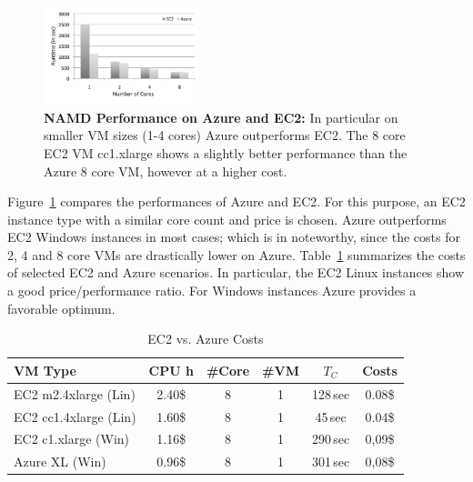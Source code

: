 \documentclass[conference,final]{IEEEtran}
\newcommand{\up}{\vspace*{-1em}}
\newcommand{\tc}{$T_{C}$ }
\begin{document}
\begin{figure}[t]
    \centering
        \includegraphics[width=0.4\textwidth]{performance/namd_ec2_azure.pdf}
        \up
        \caption{\textbf{NAMD Performance on Azure and EC2:} In
          particular on smaller VM sizes (1-4 cores) Azure outperforms
          EC2. The 8 core EC2 VM cc1.xlarge shows a slightly better
          performance than the Azure 8 core VM, however at a higher
          cost.} %
    \label{fig:performance_namd_ec2_azure}
    \up\up
\end{figure}

Figure~\ref{fig:performance_namd_ec2_azure} compares the performances
of Azure and EC2. For this purpose, an EC2 instance type with a similar core
count and price is chosen. Azure outperforms EC2 Windows instances in 
most cases; which is in noteworthy, since the costs for 2, 4 and 8 core VMs are
drastically lower on Azure. Table~\ref{tbl:costs} summarizes the
costs of selected EC2 and Azure scenarios. In particular, the EC2
Linux instances show a good price/performance ratio. For Windows
instances Azure provides a favorable optimum.



\begin{table}[ht]
    \centering
	\begin{scriptsize}
		\begin{tabular}{|l|c|c|c|c|c|}
	        \hline
	        VM Type                 &CPU h  &\#Core &\#VM &\tc &Costs  \\ \hline
	        EC2 m2.4xlarge (Lin)  &2.40\$  &8          &1      &128\,sec     &0.08\$ \\ \hline
	        EC2 cc1.4xlarge (Lin) &1.60\$  &8          &1      &45\,sec     &0.04\$ \\ \hline
	        EC2 c1.xlarge   (Win)   &1.16\$  &8          &1      &290\,sec    &0,09\$ \\ \hline
	        Azure XL (Win)  &0.96\$ &8          &1      &301\,sec    &0,08\$ \\ \hline
		\end{tabular}
	\end{scriptsize}
	\caption{EC2 vs. Azure Costs\label{tbl:costs}}
	\up
\end{table}
\end{document}
